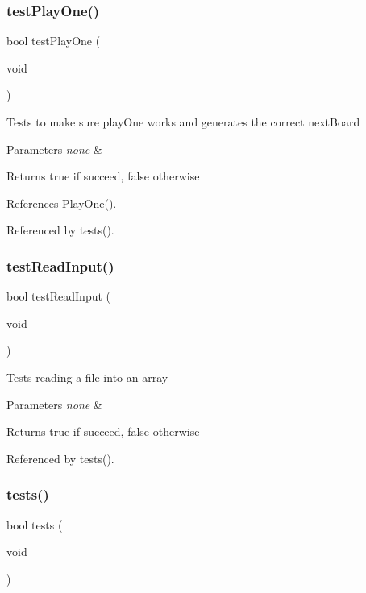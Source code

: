 \subsubsection{test\+Play\+One()}
{\footnotesize\ttfamily bool test\+Play\+One (\begin{DoxyParamCaption}\item[{void}]{ }\end{DoxyParamCaption})}

Tests to make sure play\+One works and generates the correct next\+Board 
\begin{DoxyParams}{Parameters}
{\em none} & \\
\hline
\end{DoxyParams}
\begin{DoxyReturn}{Returns}
true if succeed, false otherwise 
\end{DoxyReturn}


References Play\+One().



Referenced by tests().

\mbox{\label{tests_8h_aa89f64db87aebe77bd891e2894595e4e}} 
\subsubsection{test\+Read\+Input()}
{\footnotesize\ttfamily bool test\+Read\+Input (\begin{DoxyParamCaption}\item[{void}]{ }\end{DoxyParamCaption})}

Tests reading a file into an array 
\begin{DoxyParams}{Parameters}
{\em none} & \\
\hline
\end{DoxyParams}
\begin{DoxyReturn}{Returns}
true if succeed, false otherwise 
\end{DoxyReturn}


Referenced by tests().

\mbox{\label{tests_8h_a5e6e6e78df62797046c9ea173550a68a}} 
\subsubsection{tests()}
{\footnotesize\ttfamily bool tests (\begin{DoxyParamCaption}\item[{void}]{ }\end{DoxyParamCaption})}

